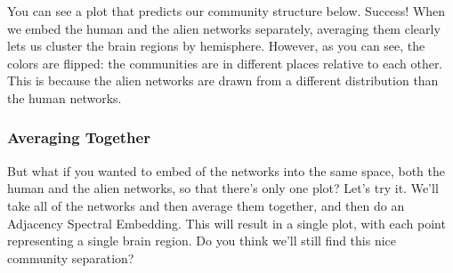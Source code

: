 \documentclass[letterpaper,10pt,english]{jupyterBook}
\begin{document}
\begin{sphinxVerbatim}[commandchars=\\\{\}]
     

  
  
\end{sphinxVerbatim}

\sphinxAtStartPar
You can see a plot that predicts our community structure below. Success! When we embed the human and the alien networks separately, averaging them clearly lets us cluster the brain regions by hemisphere. However, as you can see, the colors are flipped: the communities are in different places relative to each other. This is because the alien networks are drawn from a different distribution than the human networks.

\noindent{}


\subsubsection{Averaging Together}
\label{\detokenize{representations/ch6/multigraph-representation-learning:averaging-together}}
\sphinxAtStartPar
But what if you wanted to embed  of the networks into the same space, both the human and the alien networks, so that there’s only one plot? Let’s try it. We’ll take all of the networks and then average them together, and then do an Adjacency Spectral Embedding. This will result in a single plot, with each point representing a single brain region. Do you think we’ll still find this nice community separation?

\begin{sphinxVerbatim}[commandchars=\\\{\}]
    
  
\end{sphinxVerbatim}
\end{document}
